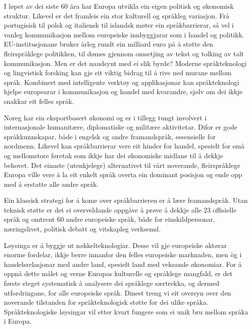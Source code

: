 
\begin{multicols}{2}

I løpet av dei siste 60 åra har Europa utvikla ein eigen politisk og økonomisk struktur. Likevel er det framleis ein stor kulturell og språkleg variasjon. Frå portugisisk til polsk og italiensk til islandsk møter ein språkbarrierar, så vel i vanleg kommunikasjon mellom europeiske innbyggjarar som i handel og politikk. EU-institusjonane bruker årleg rundt ein milliard euro på å støtte den fleirspråklege politikken, til dømes gjennom omsetjing av tekst og tolking av talt kommunikasjon. Men er det naudsynt med ei slik byrde? Moderne språkteknologi og lingvistisk forsking kan gje eit viktig bidrag til å rive ned murane mellom språk. Kombinert med intelligente verktøy og applikasjonar kan språkteknologi hjelpe europearar i kommunikasjon og handel med kvarandre, sjølv om dei ikkje snakkar eit felles språk. 


Noreg har ein eksportbasert økonomi og er i tillegg tungt involvert i internasjonale humanitære, diplomatiske og militære aktivitetar. Difor er gode språkkunnskapar, både i engelsk og andre framandspråk, essensielle for nordmenn.
Likevel kan språkbarrierar vere eit hinder for handel, spesielt for små og mellomstore føretak som ikkje har dei økonomiske midlane til å dekkje behovet. Det einaste (utenkjelege) alternativet til vårt noverande, fleirspråklege Europa ville vere å la eit enkelt språk overta ein dominant posisjon og ende opp med å erstatte alle andre språk. 

Ein klassisk strategi for å kome over språkbarrieren er å lære framandspråk. Utan teknisk støtte er det ei overveldande oppgåve å prøve å dekkje alle 23 offisielle språk og omtrent 60 andre europeiske språk, både for einskildpersonar, næringslivet, politisk debatt og vitskapleg verksemd. 

Løysinga er å byggje ut nøkkelteknologiar. Desse vil gje europeiske aktørar enorme fordelar, ikkje berre innanfor den felles europeiske marknaden, men òg i handelsrelasjonar med andre land, spesielt land med veksande økonomiar. For å oppnå dette målet og verne Europas kulturelle og språklege mangfald, er det første steget systematisk å analysere dei språklege særtrekka, og dermed utfordringane, for alle europeiske språk. Dinest treng vi eit oversyn over den noverande tilstanden for språkteknologisk støtte for dei ulike språka. Språkteknologiske løysingar vil etter kvart fungere som ei unik bru mellom språka i Europa. 
    

\end{multicols}
